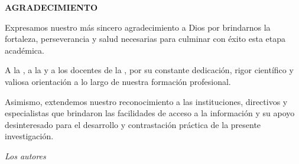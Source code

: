 \ifmostraragradecimiento
  \newpage
  \thispagestyle{estiloresponsables}
  
  \begin{center}
    {\fontsize{14pt}{18pt}\selectfont \textbf{AGRADECIMIENTO}}
  \end{center}

  \vspace{0.8cm}

  Expresamos nuestro más sincero agradecimiento a Dios por brindarnos la fortaleza, perseverancia y salud necesarias para culminar con éxito esta etapa académica.

  A la \textbf{\universidad}, a la \textbf{\facultad} y a los docentes de la \textbf{\escuela}, por su constante dedicación, rigor científico y valiosa orientación a lo largo de nuestra formación profesional.

  Asimismo, extendemos nuestro reconocimiento a las instituciones, directivos y especialistas que brindaron las facilidades de acceso a la información y su apoyo desinteresado para el desarrollo y contrastación práctica de la presente investigación.

  \vspace{1.5cm}

  \begin{flushright}
    \textit{Los autores}
  \end{flushright}

  \vfill
  \newpage
\fi
